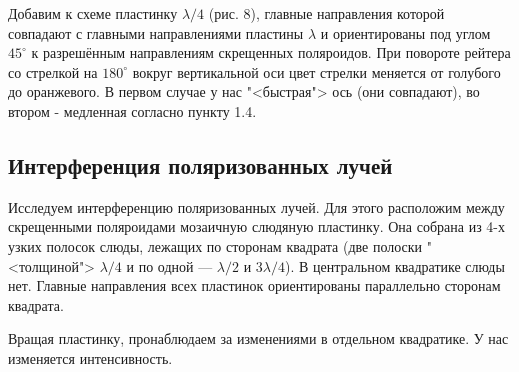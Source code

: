 \documentclass[a4paper, 12pt]{article}%
\begin{document}
	Добавим к схеме пластинку $ \lambda/4 $
	(рис. 8), главные направления которой совпадают с главными направлениями пластины $ \lambda $ и ориентированы
	под углом $ 45^\circ $ к разрешённым направлениям скрещенных поляроидов.
	При повороте рейтера со стрелкой на $ 180^\circ $ вокруг вертикальной оси
	цвет стрелки меняется от голубого до оранжевого. В первом случае у нас "<быстрая"> ось (они совпадают), во втором - медленная согласно пункту 1.4.
	
	
	\subsection{Интерференция поляризованных лучей}
	
	Исследуем интерференцию поляризованных лучей. Для этого расположим между скрещенными поляроидами мозаичную слюдяную пластинку. Она собрана из 4-х узких полосок слюды, лежащих по сторонам
	квадрата (две полоски "<толщиной"> $ \lambda/4 $ и по одной --- $ \lambda/2 $ и $ 3\lambda/4 $). В центральном квадратике слюды нет. Главные направления всех пластинок ориентированы параллельно сторонам квадрата.
	
	Вращая пластинку, пронаблюдаем за изменениями в отдельном квадратике. У нас изменяется интенсивность. 
	
\end{document}
